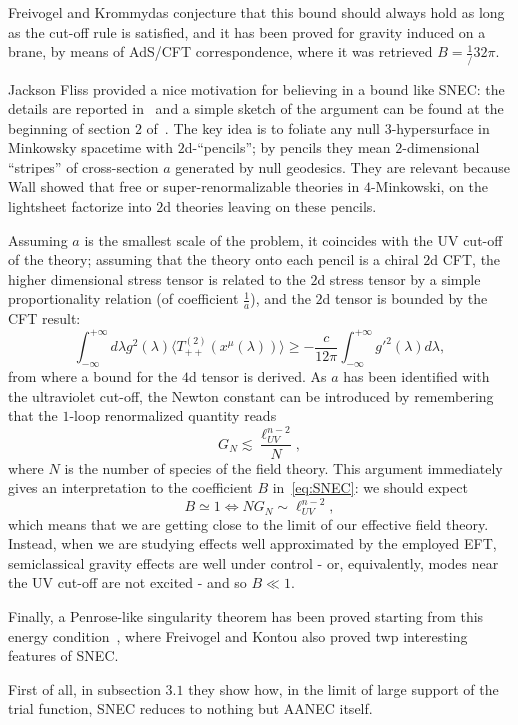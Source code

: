 Freivogel and Krommydas conjecture that this bound should always hold as long as the cut-off rule is satisfied, and it has been proved for gravity induced on a brane, by means of AdS/CFT correspondence, where it was retrieved \(B = \frac{1}/{32\pi}\).

Jackson Fliss provided a nice motivation for believing in a bound like SNEC: the details are reported in~\cite[]{fliss2022semi} and a simple sketch of the argument can be found at the beginning of section \(2\) of~\cite[]{freivogel2020return}. The key idea is to foliate any null \(3\)-hypersurface in Minkowsky spacetime with \(2\)d-``pencils''; by pencils they mean \(2\)-dimensional ``stripes'' of cross-section \(a\) generated by null geodesics. They are relevant because Wall showed that free or super-renormalizable theories in \(4\)-Minkowski, on the lightsheet factorize into \(2\)d theories leaving on these pencils.

Assuming \(a\) is the smallest scale of the problem, it coincides with the UV cut-off of the theory; assuming that the theory onto each pencil is a chiral \(2\)d CFT, the higher dimensional stress tensor is related to the \(2\)d stress tensor by a simple proportionality relation (of coefficient \(\frac{1}{a}\)), and the \(2\)d tensor is bounded by the CFT result:
\[
    \int_{-\infty}^{+\infty} d\lambda g^2(\lambda) \langle T^{(2)}_{++}(x^{\mu}(\lambda))\rangle \ge -\frac{c}{12\pi}\int_{-\infty}^{+\infty} g'^2(\lambda) d\lambda,
\]
from where a bound for the \(4\)d tensor is derived.
As \(a\) has been identified with the ultraviolet cut-off, the Newton constant can be introduced by remembering that the \(1\)-loop renormalized quantity reads
\[
G_N \lesssim \frac{\ell_{UV}^{n - 2}}{N},    
\]
where \(N\) is the number of species of the field theory.
This argument immediately gives an interpretation to the coefficient \(B\) in~\eqref{eq:SNEC}: we should expect
\[
B \simeq 1 \iff NG_N \sim  \ell_{UV}^{n - 2},  
\]
which means that we are getting close to the limit of our effective field theory. Instead, when we are studying effects well approximated by the employed EFT, semiclassical gravity effects are well under control - or, equivalently, modes near the UV cut-off are not excited - and so \(B \ll 1\).

Finally, a Penrose-like singularity theorem has been proved starting from this energy condition~\cite[]{freivogel2020return}, where Freivogel and Kontou also proved twp interesting features of SNEC. 

First of all, in subsection \(3.1\) they show how, in the limit of large support of the trial function, SNEC reduces to nothing but AANEC itself.

